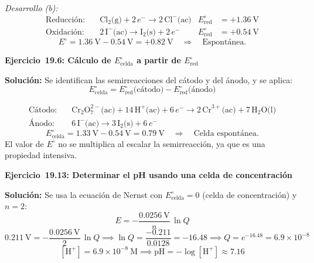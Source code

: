 \documentclass[12pt]{article}
\begin{document}
\begin{enumerate}[label=\textbf{\alph*)}, leftmargin=1.2cm]
    \textit{Desarrollo (b):}
    \begin{align*}
        \text{Reducción:} &\quad
          \text{Cl}_2\text{(g)} + 2\,e^- \to 2\,\text{Cl}^-\text{(ac)}
          & E^\circ_\text{red} &= +1.36\ \text{V} \\
        \text{Oxidación:} &\quad
          2\,\text{I}^-\text{(ac)} \to \text{I}_2\text{(s)} + 2\,e^-
          & E^\circ_\text{red} &= +0.54\ \text{V}
    \end{align*}
    \[
        E^\circ = 1.36\ \text{V} - 0.54\ \text{V} = +0.82\ \text{V}
        \quad \Rightarrow \quad \text{Espontánea.}
    \]

    \vspace{0.6cm}
    \noindent\textbf{Ejercicio~19.6: Cálculo de $E^\circ_\text{celda}$ a
    partir de $E^\circ_\text{red}$}

    \textbf{Solución:} Se identifican las semirreacciones del cátodo y del
    ánodo, y se aplica:
    \[
        E^\circ_\text{celda} = E^\circ_\text{red}\text{(cátodo)}
                             - E^\circ_\text{red}\text{(ánodo)}
    \]

    \begin{align*}
        \text{Cátodo:} &\quad
          \text{Cr}_2\text{O}_7^{2-}\text{(ac)}
          + 14\,\text{H}^+\text{(ac)} + 6\,e^-
          \to 2\,\text{Cr}^{3+}\text{(ac)} + 7\,\text{H}_2\text{O(l)} \\
        \text{Ánodo:}  &\quad
          6\,\text{I}^-\text{(ac)}
          \to 3\,\text{I}_2\text{(s)} + 6\,e^-
    \end{align*}
    \[
        E^\circ_\text{celda} = 1.33\ \text{V} - 0.54\ \text{V} = 0.79\ \text{V}
        \quad \Rightarrow \quad \text{Celda espontánea.}
    \]
    El valor de $E^\circ$ no se multiplica al escalar la semirreacción, ya
    que es una propiedad intensiva.

    \vspace{0.6cm}
    \noindent\textbf{Ejercicio~19.13: Determinar el pH usando una celda de
    concentración}

    \textbf{Solución:} Se usa la ecuación de Nernst con
    $E^\circ_\text{celda} = 0$ (celda de concentración) y $n = 2$:
    \[
        E = -\frac{0.0256\ \text{V}}{n}\,\ln Q
    \]
    \[
        0.211\ \text{V}
        = -\frac{0.0256\ \text{V}}{2}\,\ln Q
        \implies
        \ln Q = \frac{-0.211}{0.0128} = -16.48
        \implies
        Q = e^{-16.48} = 6.9 \times 10^{-8}
    \]
    \[
        [\text{H}^+] = 6.9 \times 10^{-8}\ \text{M}
        \implies
        \text{pH} = -\log[\text{H}^+] \approx 7.16
    \]


\end{enumerate}
\end{document}
